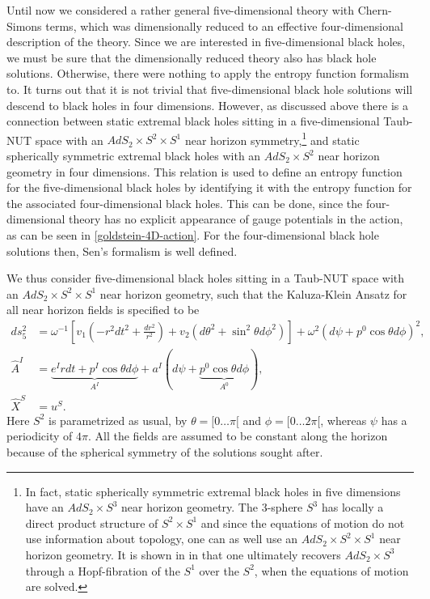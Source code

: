 \documentclass[12pt,twoside]{book}
\begin{document}
Until now we considered a rather general five-dimensional theory with Chern-Simons terms, which was dimensionally reduced to an effective four-dimensional description of the theory.
Since we are interested in five-dimensional black holes, we must be sure that the dimensionally reduced theory also has black hole solutions. Otherwise, there were nothing to apply the entropy function formalism to. It turns out that it is not trivial that five-dimensional black hole solutions will descend to black holes in four dimensions. However, as discussed above there is a connection between static extremal black holes sitting in a five-dimensional Taub-NUT space with an $AdS_{2} \times S^{2} \times S^{1}$ near horizon symmetry,\footnote{In fact, static spherically symmetric extremal black holes in five dimensions have an $AdS_{2} \times S^{3}$ near horizon geometry.
The 3-sphere $S^{3}$ has locally a direct product structure of $S^{2} \times S^{1}$ and since the equations of motion do not use information about topology, one can as well use an $AdS_{2} \times S^{2} \times S^{1}$ near horizon geometry. It is shown in in \cite{Goldstein:2007kx} that one ultimately recovers $AdS_{2} \times S^{3}$ through a Hopf-fibration of the $S^{1}$ over the $S^{2}$, when the equations of motion are solved.}
and static spherically symmetric extremal black holes with an $AdS_{2} \times S^{2}$ near horizon geometry in four dimensions. 
This relation is used to define an entropy function for the five-dimensional black holes by identifying it with the entropy function for the associated four-dimensional black holes. This can be done, since the four-dimensional theory has no explicit appearance of gauge potentials in the action, as can be seen in \eqref{goldstein-4D-action}. For the four-dimensional black hole solutions then, Sen's formalism is well defined.

We thus consider five-dimensional black holes sitting in a Taub-NUT space with an $AdS_{2} \times S^{2} \times S^{1}$ near horizon geometry, such that the Kaluza-Klein Ansatz for all near horizon fields is specified to be
\begin{equation}\label{goldstein-KK-BH}
\begin{split}
ds_{5}^{2} &= \omega^{-1} \left[ v_{1}\left( -r^{2}dt^{2} + \frac{dr^{2}}{r^{2}} \right) + v_{2} (d\theta^{2} + \sin^{2}\theta d\phi^{2}) \right]
+ \omega^{2} (d\psi + p^{0}\cos\theta d\phi)^{2}, \\
\hat{A}^{I} &= \underbrace{e^{I}rdt + p^{I}\cos\theta d\phi}_\text{$A^{I}$} 
+ a^{I} (d\psi + \underbrace{p^{0}\cos\theta d\phi}_\text{$A^{0}$}), \\
\hat{X}^{S} &= u^{S}.
\end{split}
\end{equation}
Here $S^{2}$ is parametrized as usual, by $\theta = [0\ldots\pi[$ and $\phi = [0\ldots 2\pi[$, whereas $\psi$ has a periodicity of $4\pi$. All the fields are assumed to be constant along the horizon because of the spherical symmetry of the solutions sought after.
\end{document}
